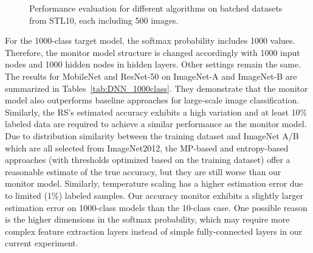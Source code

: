 \documentclass{article}
\newcommand{\cloudModel}{target model\xspace}
\newcommand{\monitorModel}{monitor model\xspace}
\begin{document}
\begin{figure}[!t]
	\centering
	
	\vspace{-0.3cm}
	\caption{Performance evaluation for different algorithms on batched datasets from STL10, each including 500 images. }\label{fig:stream_data}
	\vspace{-0.3cm}
\end{figure}

For the 1000-class \cloudModel, the softmax probability  includes 1000 values. Therefore, the \monitorModel structure is changed accordingly with 1000 input nodes and 1000 hidden nodes in hidden layers. Other settings remain the same. The results for MobileNet and ResNet-50 on ImageNet-A and ImageNet-B are summarized in Tables~\ref{tab:DNN_1000class}. They demonstrate that the \monitorModel also outperforms baseline approaches for large-scale image classification.
Similarly, the RS's estimated accuracy exhibits a high variation and at least 10\% labeled data are required to achieve a similar performance as the \monitorModel.
Due to distribution similarity
between the training dataset and ImageNet A/B which
are all selected from ImageNet2012, the MP-based
and {entropy-based} approaches (with thresholds optimized
based on the training dataset) offer a reasonable estimate of
the true accuracy, but they are still worse than our monitor model.
Similarly, temperature scaling has a higher estimation error due to limited (1\%) labeled samples.
Our accuracy monitor exhibits a
slightly
larger estimation error on 1000-class models than the 10-class case. One possible reason is the higher dimensions in the softmax probability, which may require more complex feature extraction layers instead of  simple fully-connected layers
in our current experiment.
\end{document}
